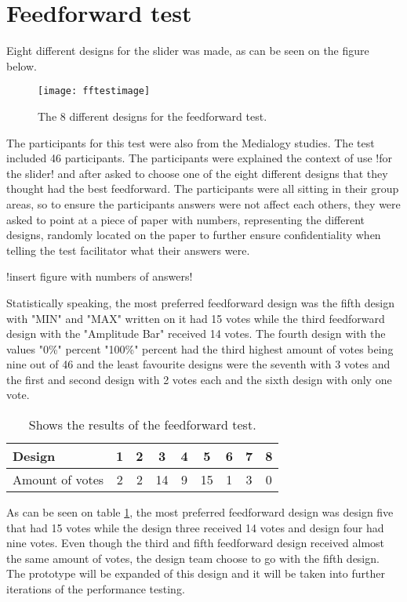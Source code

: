 \section{Feedforward test}
Eight different designs for the slider was made, as can be seen on the figure below.

\begin{figure}[!h] 
\centering
\texttt{[image: fftestimage]}
\caption{\label{fig:fftestimage} The 8 different designs for the feedforward test.}
\end{figure}

The participants for this test were also from the Medialogy studies. The test included 46 participants. The participants were explained the context of use !for the slider! and after asked to choose one of the eight different designs that they thought had the best feedforward. The participants were all sitting in their group areas, so to ensure the participants answers were not affect each others, they were asked to point at a piece of paper with numbers, representing the different designs, randomly located on the paper to further ensure confidentiality when telling the test facilitator what their answers were. 

!insert figure with numbers of answers!

Statistically speaking, the most preferred feedforward design was the fifth design with "MIN" and "MAX" written on it had 15 votes while the third feedforward design with the "Amplitude Bar"  received 14 votes. The fourth design with the values "0\%" percent "100\%" percent had the third highest amount of votes being nine out of 46 and the least favourite designs were the seventh with 3 votes and the first and second design with 2 votes each and the sixth design with only one vote. 

\begin{table}[!h]
\centering
\caption{Shows the results of the feedforward test.\label{tab:sliderresults}}
\begin{tabular}{|l|c|c|c|c|c|c|c|c|}
\hline
Design & 1 & 2 & 3 & 4 & 5 & 6 & 7 & 8 \\ \hline
Amount of votes & 2 & 2 & 14 & 9 & 15 & 1 & 3 & 0 \\ \hline
\end{tabular}
\end{table}

As can be seen on table \ref{tab:sliderresults}, the most preferred feedforward design was design five that had 15 votes while the design three received 14 votes and design four had nine votes.
Even though the third and fifth feedforward design received almost the same amount of votes, the design team choose to go with the fifth design. The prototype will be expanded of this design and it will be taken into further iterations of the performance testing. 


